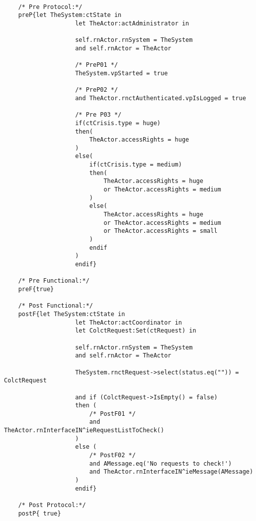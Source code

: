 	\scriptsize
	\vspace{0.5cm}
	\begin{lstlisting}[style=MessirStyle,firstnumber=auto,captionpos=b,caption={\msrmessir (MCL-oriented) specification of the operation \emph{oeGetAllRequests}.},label=OM-actCoordinator-oeGetAllRequests-MCL-LST]

	/* Pre Protocol:*/ 
	preP{let TheSystem:ctState in
					let TheActor:actAdministrator in
					
					self.rnActor.rnSystem = TheSystem
					and self.rnActor = TheActor
					
					/* PreP01 */
					TheSystem.vpStarted = true
					
					/* PreP02 */
					and TheActor.rnctAuthenticated.vpIsLogged = true
					
					/* Pre P03 */
					if(ctCrisis.type = huge)
					then(
						TheActor.accessRights = huge
					)
					else(
						if(ctCrisis.type = medium)
						then(
							TheActor.accessRights = huge
							or TheActor.accessRights = medium
						)
						else(
							TheActor.accessRights = huge
							or TheActor.accessRights = medium
							or TheActor.accessRights = small
						)
						endif
					)
					endif}
	
	/* Pre Functional:*/
	preF{true}
	
	/* Post Functional:*/ 
	postF{let TheSystem:ctState in
					let TheActor:actCoordinator in
					let ColctRequest:Set(ctRequest) in
					
					self.rnActor.rnSystem = TheSystem
					and self.rnActor = TheActor
					
					TheSystem.rnctRequest->select(status.eq("")) = ColctRequest
					
					and if (ColctRequest->IsEmpty() = false)
					then (
						/* PostF01 */
						and TheActor.rnInterfaceIN^ieRequestListToCheck()
					)
					else (
						/* PostF02 */
						and AMessage.eq('No requests to check!')
						and TheActor.rnInterfaceIN^ieMessage(AMessage)
					)
					endif}
	
	/* Post Protocol:*/ 
	postP{ true}
	
	\end{lstlisting}
	\normalsize 
	
	
	
	





